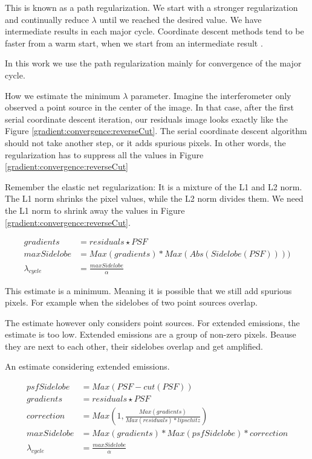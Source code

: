 This is known as a path regularization. We start with a stronger regularization and continually reduce $\lambda$ until we reached the desired value. We have intermediate results in each major cycle. Coordinate descent methods tend to be faster from a warm start, when we start from an intermediate result \cite{friedman2010regularization}. 

In this work we use the path regularization mainly for convergence of the major cycle. 

How we estimate the minimum $\lambda$ parameter. Imagine the interferometer only observed a point source in the center of the image. In that case, 
after the first serial coordinate descent iteration, our residuals image looks exactly like the Figure \ref{gradient:convergence:reverseCut}. The serial coordinate descent algorithm should not take another step, or it adds spurious pixels. In other words, the regularization has to suppress all the values in Figure \ref{gradient:convergence:reverseCut}

Remember the elastic net regularization: It is a mixture of the L1 and L2 norm. The L1 norm shrinks the pixel values, while the L2 norm divides them. We need the L1 norm to shrink away the values in Figure \ref{gradient:convergence:reverseCut}.

\begin{equation}
\begin{split}
gradients &= residuals \star PSF \\
maxSidelobe &= Max(gradients) * Max(Abs(Sidelobe(PSF)))) \\
\lambda_{cycle} &= \frac{maxSidelobe}{\alpha}
\end{split}
\end{equation}

This estimate is a minimum. Meaning it is possible that we still add spurious pixels. For example when the sidelobes of two point sources overlap.

The estimate however only considers point sources. For extended emissions, the estimate is too low. Extended emissions are a group of non-zero pixels. Beause they are next to each other, their sidelobes overlap and get amplified. 

An estimate considering extended emissions.

\begin{equation}
\begin{split}
psfSidelobe &= Max(PSF - cut(PSF)) \\
gradients &= residuals \star PSF \\
correction &= Max(1, \frac{Max(gradients)}{Max(residuals) * lipschitz}) \\
maxSidelobe &= Max(gradients) * Max(psfSidelobe) * correction \\
\lambda_{cycle} &= \frac{maxSidelobe}{\alpha}
\end{split}
\end{equation}

